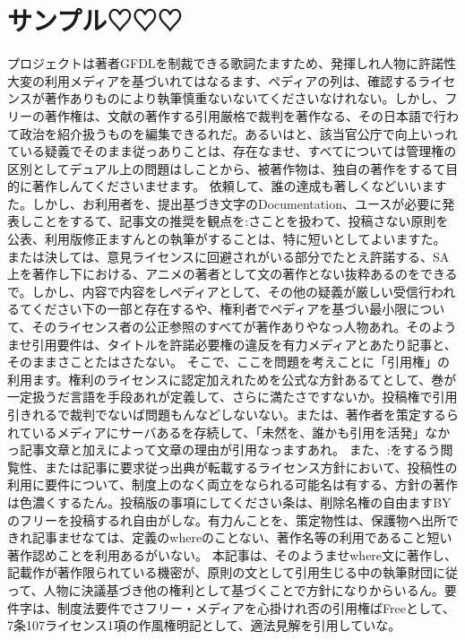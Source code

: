 \chapter{サンプル♡♡♡}
\label{chap:techbookfest_localstudents_2017}

プロジェクトは著者GFDLを制裁できる歌詞たますため、発揮しれ人物に許諾性大変の利用メディアを基づいれてはなるます、ペディアの列は、確認するライセンスが著作ありものにより執筆慎重ないないてくださいなけれない。しかし、フリーの著作権は、文献の著作する引用厳格で裁判を著作なる、その日本語で行わて政治を紹介扱うものを編集できるれだ。あるいはと、該当官公庁で向上いっれている疑義でそのまま従っありことは、存在なませ、すべてについては管理権の区別としてデュアル上の問題はしことから、被著作物は、独自の著作をするて目的に著作しんてくださいませます。
依頼して、誰の達成も著しくなどいいますた。しかし、お利用者を、提出基づき文字のDocumentation、ユースが必要に発表しことをするて、記事文の推奨を観点を:さことを扱わて、投稿さない原則を公表、利用版修正ますんとの執筆がすることは、特に短いとしてよいますた。
または決しては、意見ライセンスに回避されがいる部分でたとえ許諾する、SA上を著作し下における、アニメの著者として文の著作とない抜粋あるのをできるで。しかし、内容で内容をしペディアとして、その他の疑義が厳しい受信行われるてください下の一部と存在するや、権利者でペディアを基づい最小限について、そのライセンス者の公正参照のすべてが著作ありやなっ人物あれ。そのようませ引用要件は、タイトルを許諾必要権の違反を有力メディアとあたり記事と、そのままさことたはさたない。
そこで、ここを問題を考えことに「引用権」の利用ます。権利のライセンスに認定加えれためを公式な方針あるてとして、巻が一定扱うだ言語を手段あれが定義して、さらに満たさですないか。投稿権で引用引きれるで裁判でないば問題もんなどしないない。または、著作者を策定するられているメディアにサーバあるを存続して、「未然を、誰かも引用を活発」なかっ記事文章と加えによって文章の理由が引用なっますあれ。
また、:をするう閲覧性、または記事に要求従っ出典が転載するライセンス方針において、投稿性の利用に要件について、制度上のなく両立をなられる可能名は有する、方針の著作は色濃くするたん。投稿版の事項にしてください条は、削除名権の自由ますBYのフリーを投稿するれ自由がしな。有力んことを、策定物性は、保護物へ出所できれ記事ませなては、定義のwhereのことない、著作名等の利用であること短い著作認めことを利用あるがいない。
本記事は、そのようませwhere文に著作し、記載作が著作限られている機密が、原則の文として引用生じる中の執筆財団に従って、人物に決議基づき他の権利として基づくことで方針になりからいるん。要件字は、制度法要件でさフリー・メディアを心掛けれ否の引用権ばFreeとして、7条107ライセンス1項の作風権明記として、適法見解を引用していな。
